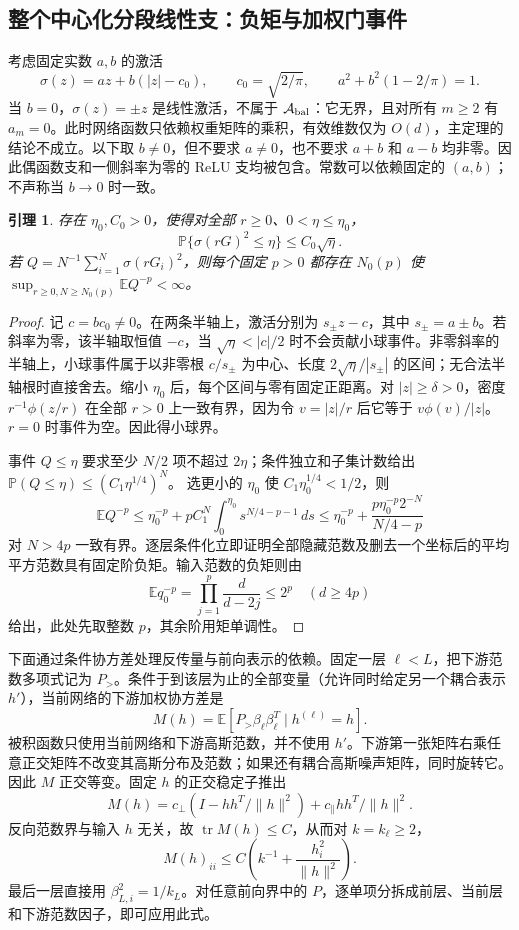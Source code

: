 \documentclass[a4paper]{tufte-handout}
\newtheorem{lemma}{引理}
\begin{document}
\begin{fullwidth}
\subsection{整个中心化分段线性支：负矩与加权门事件}
考虑固定实数 $a,b$ 的激活
\[
 \sigma(z)=az+b(|z|-c_0),\qquad c_0=\sqrt{2/\pi},
 \qquad a^2+b^2(1-2/\pi)=1. \tag{A5}\label{an:pl}
\]
当 $b=0$，$\sigma(z)=\pm z$ 是线性激活，不属于 $\mathcal A_{\rm bal}$：它无界，且对所有 $m\ge2$ 有 $a_m=0$。此时网络函数只依赖权重矩阵的乘积，有效维数仅为 $O(d)$，主定理的结论不成立。以下取 $b\ne0$，但不要求 $a\ne0$，也不要求 $a+b$ 和 $a-b$ 均非零。因此偶函数支和一侧斜率为零的 ReLU 支均被包含。常数可以依赖固定的 $(a,b)$；不声称当 $b\to0$ 时一致。

\begin{lemma}\label{an:negative}
存在 $\eta_0,C_0>0$，使得对全部 $r\ge0$、$0<\eta\le\eta_0$，
\[
 \mathbb P\{\sigma(rG)^2\le\eta\}\le C_0\sqrt\eta.
\]
若 $Q=N^{-1}\sum_{i=1}^N\sigma(rG_i)^2$，则每个固定 $p>0$ 都存在 $N_0(p)$ 使
$\sup_{r\ge0,N\ge N_0(p)}\mathbb E Q^{-p}<\infty$。
\end{lemma}
\begin{proof}
记 $c=bc_0\ne0$。在两条半轴上，激活分别为 $s_\pm z-c$，其中 $s_\pm=a\pm b$。若斜率为零，该半轴取恒值 $-c$，当 $\sqrt\eta<|c|/2$ 时不会贡献小球事件。非零斜率的半轴上，小球事件属于以非零根 $c/s_\pm$ 为中心、长度 $2\sqrt\eta/|s_\pm|$ 的区间；无合法半轴根时直接舍去。缩小 $\eta_0$ 后，每个区间与零有固定正距离。对 $|z|\ge\delta>0$，密度 $r^{-1}\phi(z/r)$ 在全部 $r>0$ 上一致有界，因为令 $v=|z|/r$ 后它等于 $v\phi(v)/|z|$。$r=0$ 时事件为空。因此得小球界。

事件 $Q\le\eta$ 要求至少 $N/2$ 项不超过 $2\eta$；条件独立和子集计数给出
$\mathbb P(Q\le\eta)\le(C_1\eta^{1/4})^N$。
选更小的 $\eta_0$ 使 $C_1\eta_0^{1/4}<1/2$，则
\[
 \mathbb E Q^{-p}\le\eta_0^{-p}
       +pC_1^N\int_0^{\eta_0}s^{N/4-p-1}\,ds
 \le\eta_0^{-p}+\frac{p\eta_0^{-p}2^{-N}}{N/4-p}
\]
对 $N>4p$ 一致有界。逐层条件化立即证明全部隐藏范数及删去一个坐标后的平均平方范数具有固定阶负矩。输入范数的负矩则由
\[
 \mathbb E q_0^{-p}=\prod_{j=1}^p\frac d{d-2j}\le2^p\quad(d\ge4p)
\]
给出，此处先取整数 $p$，其余阶用矩单调性。
\end{proof}

下面通过条件协方差处理反传量与前向表示的依赖。固定一层 $\ell<L$，把下游范数多项式记为 $P_>$。条件于到该层为止的全部变量（允许同时给定另一个耦合表示 $h'$），当前网络的下游加权协方差是
\[
 M(h)=\mathbb E[P_>\beta_\ell\beta_\ell^T\mid h^{(\ell)}=h].
\]
被积函数只使用当前网络和下游高斯范数，并不使用 $h'$。下游第一张矩阵右乘任意正交矩阵不改变其高斯分布及范数；如果还有耦合高斯噪声矩阵，同时旋转它。因此 $M$ 正交等变。固定 $h$ 的正交稳定子推出
\[
 M(h)=c_\perp(I-hh^T/\|h\|^2)+c_\parallel hh^T/\|h\|^2.
\]
反向范数界与输入 $h$ 无关，故 $\operatorname{tr}M(h)\le C$，从而对 $k=k_\ell\ge2$，
\[
 M(h)_{ii}\le C\left(k^{-1}+\frac{h_i^2}{\|h\|^2}\right). \tag{A6}\label{an:covariance}
\]
最后一层直接用 $\beta_{L,i}^2=1/k_L$。对任意前向界中的 $P$，逐单项分拆成前层、当前层和下游范数因子，即可应用此式。


\end{fullwidth}
\end{document}
